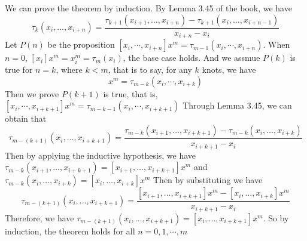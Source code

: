 \documentclass[a4paper]{article}
\begin{document}
We can prove the theorem by induction. By Lemma 3.45 of the book, we have 
\begin{equation}
  \tau_k(x_i, \dots, x_{i+n}) = \frac{\tau_{k+1}(x_{i+1}, \dots, x_{i+n}) - \tau_{k+1}(x_i, \dots, x_{i+n-1})}{x_{i+n} - x_i}
\end{equation}
Let $P(n)$ be the proposition $[x_i,\cdots,x_{i+n}]x^m=\tau_{m-1}(x_i,\cdots,x_{i+n})$.\newline
When $n=0$, $[x_i]x^m = x_i^m=\tau_m(x_i)$, the base case holds.\newline
And we assmue $P(k)$ is true for $n=k$, where $k<m$, that is to say, for any $k$ knots, we have 
\begin{equation}
  [x_i,\cdots,x_{i+k}]x^m=\tau_{m-k}(x_i,\cdots,x_{i+k})
\end{equation}
Then we prove $P(k+1)$ is true, that is, $[x_i,\cdots,x_{i+k+1}]x^m=\tau_{m-k-1}(x_i,\cdots,x_{i+k+1})$
Through Lemma 3.45, we can obtain that
\begin{equation}
  \tau_{m-(k+1)}(x_i, \dots, x_{i+k+1}) = \frac{\tau_{m-k}(x_{i+1}, \dots, x_{i+k+1}) - \tau_{m-k}(x_i, \dots, x_{i+k})}{x_{i+k+1} - x_i}
\end{equation}
Then by applying the inductive hypothesis, we have $\tau_{m-k}(x_{i+1}, \dots, x_{i+k+1}) = [x_{i+1}, \dots, x_{i+k+1}]x^m$ and $\tau_{m-k}(x_i, \dots, x_{i+k}) = [x_i, \dots, x_{i+k}]x^m$
Then by substituting we have 
\begin{equation}
  \tau_{m-(k+1)}(x_i, \dots, x_{i+k+1}) = \frac{[x_{i+1}, \dots, x_{i+k+1}]x^m - [x_i, \dots, x_{i+k}]x^m}{x_{i+k+1} - x_i}
\end{equation}
Therefore, we have $\tau_{m-(k+1)}(x_i, \dots, x_{i+k+1}) = [x_i, \dots, x_{i+k+1}]x^m$. So by induction, the theorem holds for all $n=0,1,\cdots,m$
\end{document}

